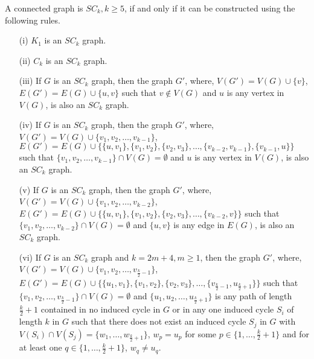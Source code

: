 \documentclass[runningheads]{llncs}
\begin{document}
\begin{theorem}
\label{construction}
A connected graph is $SC_k, k\geq 5$, if and only if it can be constructed using the following rules.
\begin{itemize}
\item[(i)] $K_1$ is an $SC_k$ graph.
\item[(ii)] $C_k$ is an $SC_k$ graph.
\item[(iii)] If $G$ is an $SC_k$ graph, then the graph $G'$, where, $V(G') = V(G) \cup \{v\}$, $E(G') = E(G) \cup \{u, v\}$ such that $v \notin V(G)$ and $u$ is any vertex in $V(G)$,  is also an $SC_k$ graph.
\item[(iv)] If $G$ is an $SC_k$ graph, then the graph $G'$, where, $V(G') = V(G) \cup \{v_1, v_2, \ldots, v_{k-1}\}$, $E(G') = E(G) \cup \{\{u, v_1\}, \{v_1, v_2\}, \{v_2, v_3\},  \ldots, \{v_{k-2}, v_{k-1}\}, \{v_{k-1}, u\} \}$ such that $\{v_1, v_2, \ldots, v_{k-1}\} \cap V(G) = \emptyset$ and $u$ is any vertex in $V(G)$,  is also an $SC_k$ graph.
\item[(v)] If $G$ is an $SC_k$ graph, then the graph $G'$, where, $V(G') = V(G) \cup \{v_1, v_2, \ldots, v_{k-2}\}$, $E(G') = E(G) \cup \{\{u, v_1\}, \{v_1, v_2\}, \{v_2, v_3\}, \ldots, \{v_{k-2}, v\} \}$ such that $\{v_1, v_2, \ldots, v_{k-2}\} \cap V(G) = \emptyset$ and $\{u, v\}$ is any edge in $E(G)$,  is also an $SC_k$ graph.
\item[(vi)] If $G$ is an $SC_k$ graph and $ k=2m+4, m \geq 1$, then the graph $G'$, where, $V(G') = V(G) \cup \{v_1, v_2, \ldots, v_{\frac{k}{2}-1}\}$, $E(G') = E(G) \cup \{\{u_1, v_1\}, \{v_1, v_2\}, \{v_2, v_3\}, \ldots, \{v_{\frac{k}{2}-1}, u_{\frac{k}{2}+1}\} \}$ such that $\{v_1, v_2, \ldots, v_{\frac{k}{2}-1}\} \cap V(G) = \emptyset$ and $\{u_1,u_2,\ldots,u_{\frac{k}{2}+1}\}$ is any path of length $\frac{k}{2}+1$ contained in no induced cycle in $G$ or in any one induced cycle $S_i$ of length $k$ in $G$ such that there does not exist an induced cycle $S_j$ in $G$ with $V(S_i) \cap V(S_j) = \{w_1,\ldots,w_{\frac{k}{2}+1}\}$, $w_p = u_p$ for some $p \in\{1,\ldots, \frac{k}{2}+1\}$ and for at least one $q \in\{1,\ldots, \frac{k}{2}+1\}$, $w_q \neq u_q$.
\end{itemize}
\end{theorem} 
\end{document}
